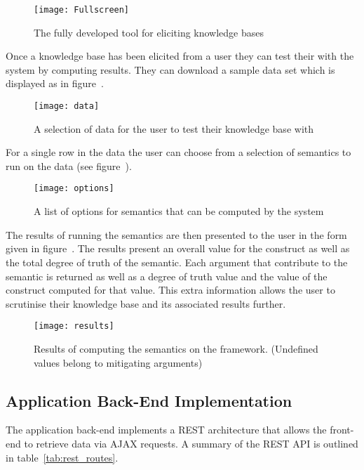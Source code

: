 \begin{figure}[!h]
\label{fig:finalUI}
\centering
\texttt{[image: Fullscreen]}
\caption{The fully developed tool for eliciting knowledge bases}
\end{figure}

Once a knowledge base has been elicited from a user they can test their with the system by computing results. They can download a sample data set which is displayed as in figure~\cite{fig:sampleData}.

\begin{figure}[!h]
\label{fig:sampleData}
\centering
\texttt{[image: data]}
\caption{A selection of data for the user to test their knowledge base with}
\end{figure}

For a single row in the data the user can choose from a selection of semantics to run on the data (see figure~\cite{fig:semantics}).

\begin{figure}[!h]
\label{fig:semantics}
\centering
\texttt{[image: options]}
\caption{A list of options for semantics that can be computed by the system}
\end{figure}

The results of running the semantics are then presented to the user in the form given in figure~\cite{fig:semantics_results}. The results present an overall value for the construct as well as the total degree of truth of the semantic. Each argument that contribute to the semantic is returned as well as a degree of truth value and the value of the construct computed for that value. This extra information allows the user to scrutinise their knowledge base and its associated results further.

\begin{figure}[!h]
\label{fig:semantics_results}
\centering
\texttt{[image: results]}
\caption{Results of computing the semantics on the framework. (Undefined values belong to mitigating arguments)}
\end{figure}

\subsection{Application Back-End Implementation}

The application back-end implements a REST architecture that allows the front-end to retrieve data via AJAX requests. A summary of the REST API is outlined in table~\ref{tab:rest_routes}.

